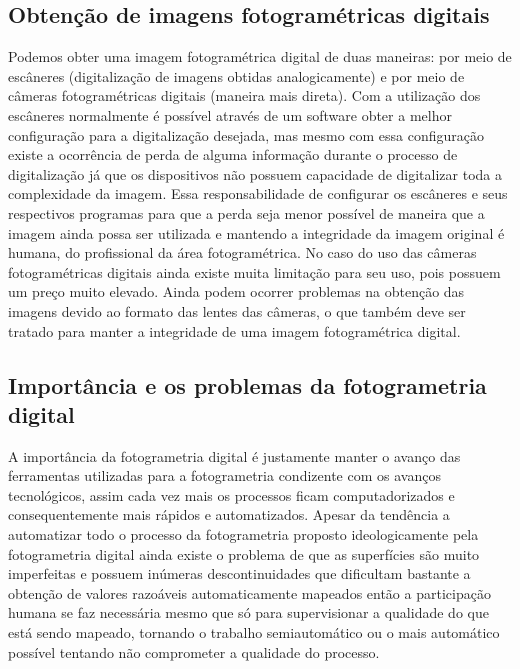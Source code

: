 \subsection{Obtenção de imagens fotogramétricas digitais}
Podemos obter uma imagem fotogramétrica digital de duas maneiras: por meio de escâneres (digitalização de imagens obtidas analogicamente) e por meio de câmeras fotogramétricas digitais (maneira mais direta). Com a utilização dos escâneres normalmente é possível através de um software obter a melhor configuração para a digitalização desejada, mas mesmo com essa configuração existe a ocorrência de perda de alguma informação durante o processo de digitalização já que os dispositivos não possuem capacidade de digitalizar toda a complexidade da imagem. Essa responsabilidade de configurar os escâneres e seus respectivos programas para que a perda seja menor possível de maneira que a imagem ainda possa ser utilizada e mantendo a integridade da imagem original é humana, do profissional da área fotogramétrica. No caso do uso das câmeras fotogramétricas digitais ainda existe muita limitação para seu uso, pois possuem um preço muito elevado. Ainda podem ocorrer problemas na obtenção das imagens devido ao formato das lentes das câmeras, o que também deve ser tratado para manter a integridade de uma imagem fotogramétrica digital.

\subsection{Importância e os problemas da fotogrametria digital}
A importância da fotogrametria digital é justamente manter o avanço das ferramentas utilizadas para a fotogrametria condizente com os avanços tecnológicos, assim cada vez mais os processos ficam computadorizados e consequentemente mais rápidos e automatizados.
Apesar da tendência a automatizar todo o processo da fotogrametria proposto ideologicamente pela fotogrametria digital ainda existe o problema de que as superfícies são muito imperfeitas e possuem inúmeras descontinuidades que dificultam bastante a obtenção de valores razoáveis automaticamente mapeados então a participação humana se faz necessária mesmo que só para supervisionar a qualidade do que está sendo mapeado, tornando o trabalho semiautomático ou o mais automático possível tentando não comprometer a qualidade do processo.

